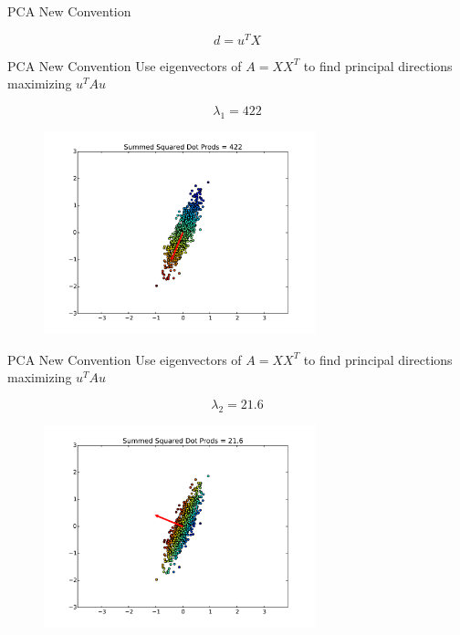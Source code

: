 \documentclass{beamer}
\begin{document}
\begin{frame}{PCA New Convention}

\[ d = u^TX \]




\end{frame}

\begin{frame}{PCA New Convention}
Use eigenvectors of $A = XX^T$ to find principal directions maximizing $u^TAu$

\[\lambda_1 = 422 \]
\begin{figure}[t]
\centering
\includegraphics[width=0.7\textwidth]{2DPCADirMax.pdf}
\end{figure}


\end{frame}

\begin{frame}{PCA New Convention}
Use eigenvectors of $A = XX^T$ to find principal directions maximizing $u^TAu$

\[\lambda_2 = 21.6 \]
\begin{figure}[t]
\centering
\includegraphics[width=0.7\textwidth]{2DPCADirMin.pdf}
\end{figure}


\end{frame}
\end{document}
